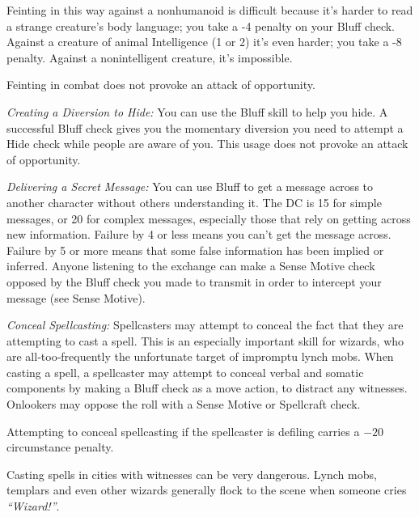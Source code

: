 Feinting in this way against a nonhumanoid is difficult because it’s harder to read a strange creature’s body language; you take a -4 penalty on your Bluff check. Against a creature of animal Intelligence (1 or 2) it’s even harder; you take a -8 penalty. Against a nonintelligent creature, it’s impossible.

Feinting in combat does not provoke an attack of opportunity.

\textit{Creating a Diversion to Hide:} You can use the Bluff skill to help you hide. A successful Bluff check gives you the momentary diversion you need to attempt a Hide check while people are aware of you. This usage does not provoke an attack of opportunity.

\textit{Delivering a Secret Message:} You can use Bluff to get a message across to another character without others understanding it. The DC is 15 for simple messages, or 20 for complex messages, especially those that rely on getting across new information. Failure by 4 or less means you can’t get the message across. Failure by 5 or more means that some false information has been implied or inferred. Anyone listening to the exchange can make a Sense Motive check opposed by the Bluff check you made to transmit in order to intercept your message (see Sense Motive).

\textit{Conceal Spellcasting:} Spellcasters may attempt to conceal the fact that they are attempting to cast a spell. This is an especially important skill for wizards, who are all‐too‐frequently the unfortunate target of impromptu lynch mobs. When casting a spell, a spellcaster may attempt to conceal verbal and somatic components by making a Bluff check as a move action, to distract any witnesses. Onlookers may oppose the roll with a Sense Motive or Spellcraft check.

Attempting to conceal spellcasting if the spellcaster is defiling carries a $-20$ circumstance penalty.


Casting spells in cities with witnesses can be very dangerous. Lynch mobs, templars and even other wizards generally flock to the scene when someone cries \textit{``Wizard!''}.

